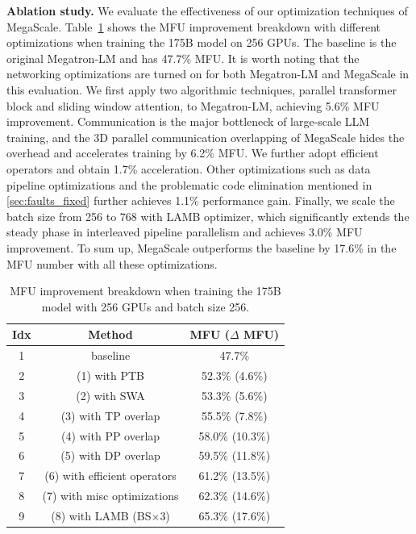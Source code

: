 \documentclass[letterpaper,twocolumn,10pt]{article}
\newcommand{\parabf}[1]{\medskip\noindent\textbf{#1}}
\newcommand{\sysname}{MegaScale\xspace}
\newcommand{\revision}[1]{{#1}}
\begin{document}
\parabf{Ablation study.} 
We evaluate the effectiveness of our optimization techniques of {\sysname}.
Table~\ref{tab:exp-ablation} shows the MFU improvement breakdown with different
optimizations when training the 175B model on 256 GPUs. The baseline \revision{is the original Megatron-LM and} has 47.7\%
MFU. It is worth noting that the networking optimizations are 
turned on for both Megatron-LM and {\sysname} in this evaluation. We first apply 
two algorithmic techniques, parallel transformer block and
sliding window attention, to Megatron-LM, achieving 5.6\% MFU improvement. 
Communication is the major bottleneck of large-scale LLM training, and
the 3D parallel communication overlapping of {\sysname} hides the overhead and
accelerates training by 6.2\% MFU. We further adopt efficient operators and obtain 
1.7\% acceleration. Other optimizations such as data pipeline 
optimizations and the problematic code elimination mentioned 
in \ref{sec:faults_fixed} further achieves 1.1\%
performance gain. Finally, we scale the batch size from 256 to 768 with LAMB
optimizer, which significantly extends the steady phase in interleaved pipeline
parallelism and achieves 3.0\% MFU improvement.  To sum up, {\sysname}
outperforms the baseline by 17.6\% in the MFU number with all these
optimizations.

\begin{table}[t]
    \centering
    \begin{tabular}{|c|c|c|}
        \hline
        Idx & Method & MFU ($\Delta$ MFU) \\
        \hline
        1 &  baseline & 47.7\% \\
        2 &  (1) with PTB & 52.3\% (4.6\%)  \\
        3 &  (2) with SWA & 53.3\% (5.6\%) \\
        4 &  (3) with TP overlap & 55.5\% (7.8\%) \\
        5 &  (4) with PP overlap &  58.0\% (10.3\%)\\
        6 &  (5) with DP overlap &  59.5\% (11.8\%)\\
        7 &  (6) with efficient operators &  61.2\% (13.5\%)\\
        8 &  (7) with misc optimizations & 62.3\% (14.6\%)  \\
        9 & (8) with LAMB (BS$\times$3) &  65.3\% (17.6\%)\\
         \hline
    \end{tabular}
    \caption{MFU improvement breakdown when training the 175B model with 256 GPUs and batch size 256.}
    \label{tab:exp-ablation}
\end{table}
\end{document}
